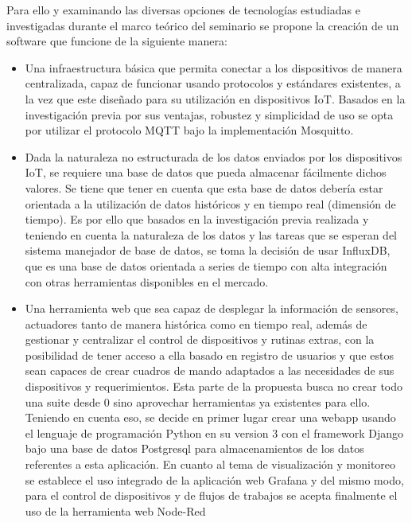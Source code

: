 Para ello y examinando las diversas opciones de tecnologías estudiadas e investigadas durante el marco teórico del seminario se propone la creación de un software que funcione de la siguiente manera: 
\begin{itemize}
\item Una infraestructura básica que permita conectar a los dispositivos de manera centralizada, capaz de funcionar usando protocolos y estándares existentes, a la vez que este diseñado para su utilización en dispositivos IoT. Basados en la investigación previa por sus ventajas, robustez y simplicidad de uso se opta por utilizar el protocolo MQTT\cite{iotprotocols} bajo la implementación Mosquitto\cite{ALight2017}.

\item Dada la naturaleza no estructurada de los datos enviados por los dispositivos IoT, se requiere una base de datos que pueda almacenar fácilmente dichos valores. Se tiene que tener en cuenta que esta base de datos debería estar orientada a la utilización de datos históricos y en tiempo real (dimensión de tiempo). Es por ello que basados en la investigación previa realizada y teniendo en cuenta la naturaleza de los datos y las tareas que se esperan del sistema manejador de base de datos, se toma la decisión de usar InfluxDB\cite{influxdb}, que es una base de datos orientada a series de tiempo con alta integración con otras herramientas disponibles en el mercado.

\item  Una herramienta web que sea capaz de desplegar la información de sensores, actuadores tanto de manera histórica como en tiempo real, además de gestionar y centralizar el control de dispositivos y rutinas extras, con la posibilidad de tener acceso a ella basado en registro de usuarios y que estos sean capaces de crear cuadros de mando adaptados a las necesidades de sus dispositivos y requerimientos. Esta parte de la propuesta busca no crear todo una suite desde 0 sino aprovechar herramientas ya existentes para ello. Teniendo en cuenta eso, se decide en primer lugar crear una webapp usando el lenguaje de programación Python\cite{whatspython} en su version 3 con el framework Django\cite{django} bajo una base de datos Postgresql\cite{postgresql} para almacenamientos de los datos referentes a esta aplicación. En cuanto al tema de visualización y monitoreo se establece el uso integrado de la aplicación web Grafana\cite{grafana} y del mismo modo, para el control de dispositivos y de flujos de trabajos se acepta finalmente el uso de la herramienta web Node-Red\cite{nodered}

\end{itemize}

